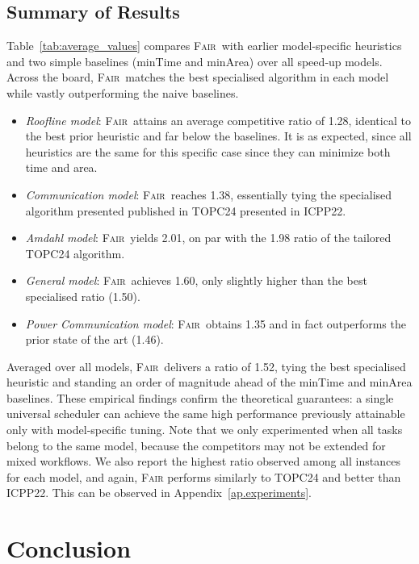 \documentclass{article}
\newcommand\fair{\textsc{Fair}\xspace}
\begin{document}
\subsection{Summary of Results}
\label{sec.expresults}

Table~\ref{tab:average_values} compares \fair\ with earlier model‑specific heuristics and two simple baselines (minTime and minArea) over all speed‑up models.  
Across the board, \fair\ matches the best specialised algorithm in each model while vastly outperforming the naive baselines.

\begin{itemize}
\item \textit{Roofline model}: \fair\ attains an average competitive ratio of 1.28, identical to the best prior heuristic and far below the baselines.  It is as expected, since all heuristics are the same for this specific case since they can minimize both time and area. 
\item \textit{Communication model}: \fair\ reaches 1.38, essentially tying the specialised algorithm presented published in TOPC24 presented in ICPP22.  
\item \textit{Amdahl model}: \fair\ yields 2.01, on par with the 1.98 ratio of the tailored TOPC24 algorithm.  
\item \textit{General model}: \fair\ achieves 1.60, only slightly higher than the best specialised ratio (1.50).  
\item \textit{Power Communication model}: \fair\ obtains 1.35 and in fact outperforms the prior state of the art (1.46).  
\end{itemize}

Averaged over all models, \fair\ delivers a ratio of 1.52, tying the best specialised heuristic and standing an order of magnitude ahead of the minTime and minArea baselines.  
These empirical findings confirm the theoretical guarantees: a single universal scheduler can achieve the same high performance previously attainable only with model‑specific tuning. Note that we only experimented when all tasks belong to the same model, because the competitors may not be extended for mixed workflows. We also report the highest ratio observed among all instances for each model, and again, \fair performs similarly to TOPC24 and better than ICPP22. This can be observed in Appendix~\ref{ap.experiments}.


\section{Conclusion}
\label{sec.conclusion}
\end{document}
